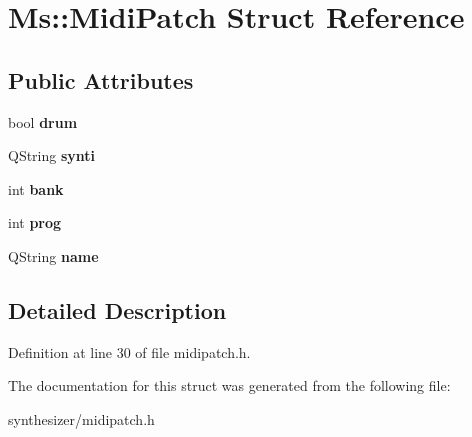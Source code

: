 \hypertarget{struct_ms_1_1_midi_patch}{}\section{Ms\+:\+:Midi\+Patch Struct Reference}
\label{struct_ms_1_1_midi_patch}
\subsection*{Public Attributes}
\begin{DoxyCompactItemize}
\item 
\mbox{\label{struct_ms_1_1_midi_patch_a5e94186cc042ec919e7ae46c45247d2c}} 
bool {\bfseries drum}
\item 
\mbox{\label{struct_ms_1_1_midi_patch_a344b15c8a58e629c6240c7a484953531}} 
Q\+String {\bfseries synti}
\item 
\mbox{\label{struct_ms_1_1_midi_patch_a198ed8155d904a70c3b4ce8891f4fb74}} 
int {\bfseries bank}
\item 
\mbox{\label{struct_ms_1_1_midi_patch_a27952fb45360b530f1408c23d3a1f16d}} 
int {\bfseries prog}
\item 
\mbox{\label{struct_ms_1_1_midi_patch_ab932ca842fcbf715d24e5ee993b856eb}} 
Q\+String {\bfseries name}
\end{DoxyCompactItemize}


\subsection{Detailed Description}


Definition at line 30 of file midipatch.\+h.



The documentation for this struct was generated from the following file\+:\begin{DoxyCompactItemize}
\item 
synthesizer/midipatch.\+h\end{DoxyCompactItemize}
